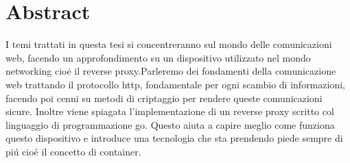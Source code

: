 \chapter*{Abstract}
\label{cha:abtract}
I temi trattati in questa tesi si concentreranno sul mondo delle comunicazioni web, facendo un approfondimento su un dispositivo utilizzato nel mondo networking cioė il reverse proxy.Parleremo dei fondamenti della comunicazione web trattando il protocollo http, fondamentale per ogni scambio di informazioni, facendo poi cenni su metodi di criptaggio per rendere queste comunicazioni sicure. Inoltre viene spiagata l'implementazione di un reverse proxy scritto col linguaggio di programmazione go. Questo aiuta a capire meglio come funziona questo dispositivo e introduce una tecnologia che sta prendendo piede sempre di piú cioé il concetto di container.
